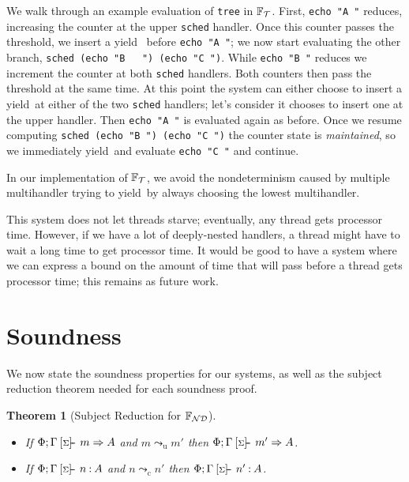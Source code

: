\documentclass[msc,deptreport,cs]{infthesis} %
\newtheorem{theorem}{Theorem}
\newcommand{\code}[1]{\lstinline{#1}}
\newcommand\nondetfrank{$\mathbb{F}_{\cal{ND}}$}
\newcommand\treefrank{$\mathbb{F}_{\cal{T}}$}
\newcommand\yield{\textsf{yield}\xspace}
\newcommand{\todo}[1]
           {{\par\noindent\small\color{RoyalPurple}
  \framebox{\parbox{\dimexpr\linewidth-2\fboxsep-2\fboxrule}
    {\textbf{TODO:} #1}}}}
\newcommand{\sigentails}[1]{\mathbin{[{\text{\scriptsize ${#1}$}}]\hspace{-0.4ex}\text{-\!-}}\,}
\newcommand{\inferbase}[5]{#1; #3 \mathbin{#2} {#4} \Rightarrow {#5}}
\newcommand{\checkbase}[5]{#1; #3 \mathbin{#2} #5 \mathbin{:} #4}
\newcommand{\makes}[5]{\inferbase{#1}{\sigentails{#3}}{#2}{#4}{#5}}
\newcommand{\has}[5]{\checkbase{#1}{\sigentails{#3}}{#2}{#4}{#5}}
\newcommand{\inferskgs}{\makes{\kenv}{\Gamma}{\sigs}}
\newcommand{\checkskgs}{\has{\kenv}{\Gamma}{\sigs}}
\newcommand{\sigs}{\Sigma}
\newcommand{\redtou}{\leadsto_{\mathrm{u}}}
\newcommand{\redtoc}{\leadsto_{\mathrm{c}}}
\newcommand{\kenv}{\Phi}  %
\begin{document}
We walk through an example evaluation of \code{tree} in \treefrank. First,
\code{echo "A "} reduces, increasing the counter at the upper \code{sched}
handler. Once this counter passes the threshold, we insert a \yield~ before
\code{echo "A "}; we now start evaluating the other branch, \code{sched (echo "B
  ") (echo "C ")}. While \code{echo "B "} reduces we increment the counter at
both \code{sched} handlers. Both counters then pass the threshold at the same
time. At this point the system can either choose to insert a \yield~at either of
the two \code{sched} handlers; let's consider it chooses to insert one at the
upper handler. Then \code{echo "A "} is evaluated again as before. Once we
resume computing \code{sched (echo "B ") (echo "C ")} the counter state is
\emph{maintained}, so we immediately \yield~and evaluate \code{echo "C "} and
continue.

In our implementation of \treefrank, we avoid the nondeterminism caused by
multiple multihandler trying to \yield~by always choosing the lowest multihandler.

This system does not let threads starve; eventually, any thread gets processor
time. However, if we have a lot of deeply-nested handlers, a thread might have
to wait a long time to get processor time. It would be good to have a system
where we can express a bound on the amount of time that will pass before a
thread gets processor time; this remains as future work.

\todo{Rewrite above.}

\section{Soundness}


We now state the soundness properties for our systems, as well as the subject
reduction theorem needed for each soundness proof.

\begin{theorem}[Subject Reduction for \nondetfrank]~
  \label{thm:sub-red}
\begin{itemize}
\item If $\inferskgs{m}{A}$ and $m \redtou m'$ then $\inferskgs{m'}{A}$.
\item If $\checkskgs{A}{n}$ and $n \redtoc n'$ then $\checkskgs{A}{n'}$.
\end{itemize}
\end{theorem}
\end{document}
